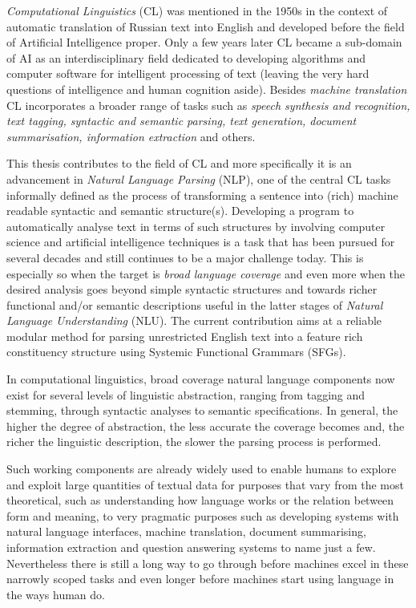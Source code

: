 \textit{Computational Linguistics} (CL) was mentioned in the 1950s in the context of automatic translation \citep{Hutchins1999} of Russian text into English and developed before the field of Artificial Intelligence proper. Only a few years later CL became a sub-domain of AI as an interdisciplinary field dedicated to developing algorithms and computer software for intelligent processing of text (leaving the very hard questions of intelligence and human cognition aside). Besides \textit{machine translation} CL incorporates a broader range of tasks such as \textit{speech synthesis and recognition, text tagging, syntactic and semantic parsing, text generation, document summarisation, information extraction} and others. 

This thesis contributes to the field of CL and more specifically it is an advancement in \textit{Natural Language Parsing} (NLP), one of the central CL tasks informally defined as the process of transforming a sentence into (rich) machine readable syntactic and semantic structure(s). Developing a program to automatically analyse text in terms of such structures by involving computer science and artificial intelligence techniques is a task that has been pursued for several decades and still continues to be a major challenge today. This is especially so when the target is \textit{broad language coverage} and even more when the desired analysis goes beyond simple syntactic structures and towards richer functional and/or semantic descriptions useful in the latter stages of \textit{Natural Language Understanding} (NLU). The current contribution aims at a reliable modular method for parsing unrestricted English text into a feature rich constituency structure using Systemic Functional Grammars (SFGs). 

In computational linguistics, broad coverage natural language components now exist for several levels of linguistic abstraction, ranging from tagging and stemming, through syntactic analyses to semantic specifications. In general, the higher the degree of abstraction, the less accurate the coverage becomes and, the richer the linguistic description, the slower the parsing process is performed. 

Such working components are already widely used to enable humans to explore and exploit large quantities of textual data for purposes that vary from the most theoretical, such as understanding how language works or the relation between form and meaning, to very pragmatic purposes such as developing systems with natural language interfaces, machine translation, document summarising, information extraction and question answering systems to name just a few. Nevertheless there is still a long way to go through before machines excel in these narrowly scoped tasks and even longer before machines start using language in the ways human do.

